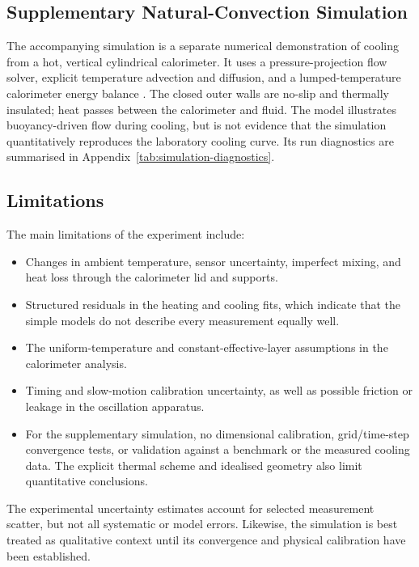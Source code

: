 \documentclass[12pt,a4paper]{article}
\begin{document}
\subsection{Supplementary Natural-Convection Simulation}

The accompanying simulation is a separate numerical
demonstration of cooling from a hot, vertical cylindrical
calorimeter. It uses a pressure-projection flow solver, explicit
temperature advection and diffusion, and a lumped-temperature
calorimeter energy balance \cite{cullinane2026simulation}.
The closed outer walls are no-slip and thermally insulated; heat
passes between the calorimeter and fluid. The model illustrates
buoyancy-driven flow during cooling, but is not evidence that
the simulation quantitatively reproduces the laboratory cooling
curve. Its run diagnostics are summarised in
Appendix~\ref{tab:simulation-diagnostics}.

\subsection{Limitations}

The main limitations of the experiment include:

\begin{itemize}
    \item Changes in ambient temperature, sensor uncertainty,
    imperfect mixing, and heat loss through the calorimeter lid
    and supports.
    \item Structured residuals in the heating and cooling fits,
    which indicate that the simple models do not describe every
    measurement equally well.
    \item The uniform-temperature and constant-effective-layer
    assumptions in the calorimeter analysis.
    \item Timing and slow-motion calibration uncertainty, as
    well as possible friction or leakage in the oscillation
    apparatus.
    \item For the supplementary simulation, no dimensional
    calibration, grid/time-step convergence tests, or validation
    against a benchmark or the measured cooling data. The
    explicit thermal scheme and idealised geometry also limit
    quantitative conclusions.
\end{itemize}

The experimental uncertainty estimates account for selected
measurement scatter, but not all systematic or model errors.
Likewise, the simulation is best treated as qualitative context
until its convergence and physical calibration have been
established.
\end{document}
